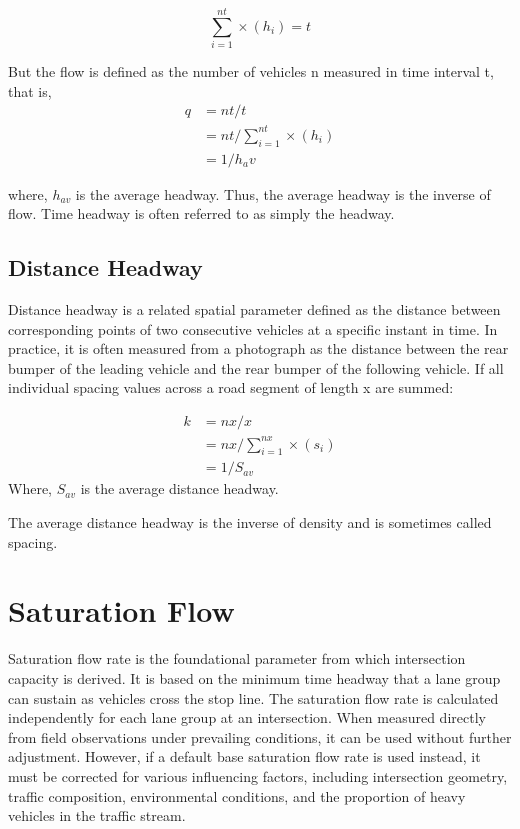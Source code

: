 \begin{equation*}
\sum_{i=1}^{nt}\times (h_i ) = t
\end{equation*}

But the flow is defined as the number of vehicles n measured 
in time interval t, that is,
\begin{align*}
    q &= nt / t \\
      &= nt/\sum_{i=1}^{nt}\times(h_i) \\
      &=1 / h_av
\end{align*}

where, $h_{av}$ is the average headway. Thus, the average headway is 
the inverse of flow. Time headway is often referred to as 
simply the headway.


\subsection{Distance Headway}
Distance headway is a related spatial parameter defined as 
the distance between corresponding points of two consecutive 
vehicles at a specific instant in time. In practice, it is 
often measured from a photograph as the distance between the 
rear bumper of the leading vehicle and the rear bumper of 
the following vehicle. If all individual spacing values 
across a road segment of length x are summed:

\begin{align*}
    k &=nx/x \\
      &= nx/\sum_{i=1}^{nx}\times(s_i)\\ 
      &= 1/S_{av}
\end{align*}
Where, $S_{av}$ is the average distance headway. 

The average distance headway is the inverse of density and is sometimes called spacing.

\section{Saturation Flow}

Saturation flow rate is the foundational parameter from 
which intersection capacity is derived. It is based on the 
minimum time headway that a lane group can sustain as 
vehicles cross the stop line. The saturation flow rate is 
calculated independently for each lane group at an 
intersection. When measured directly from field observations 
under prevailing conditions, it can be used without further 
adjustment. However, if a default base saturation flow rate 
is used instead, it must be corrected for various influencing 
factors, including intersection geometry, traffic composition, 
environmental conditions, and the proportion of heavy vehicles 
in the traffic stream.

